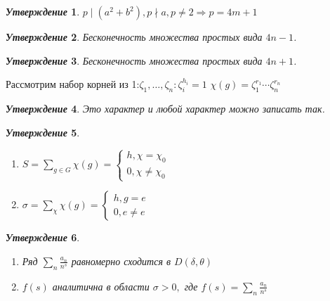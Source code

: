 \documentclass[a4paper,12pt]{article}
\newtheorem{utv2}{\textit{Утверждение}}
\newcommand{\TE}{\theta}
\newcommand{\q}{\quad}
\newcommand{\Ra}{\Rightarrow}
\newcommand{\SL}{\sum\limits}
\begin{document}
\begin{formbox}{}
\begin{utv2} $p\mid (a^2+b^2), p\nmid a, p\not=2 \Ra p = 4m+1$
\end{utv2}
\end{formbox}
\begin{formbox}{}
\begin{utv2} Бесконечность множества простых вида $4n-1$.
\end{utv2}
\end{formbox}
\begin{formbox}{}
\begin{utv2} Бесконечность множества простых вида $4n+1$.
\end{utv2}
\end{formbox}
\begin{formbox}{}
Рассмотрим набор корней из 1:$\zeta_1,\dots,\zeta_n: \zeta_i^{h_i} = 1$\q
$\chi(g) = \zeta_1^{r_1}\cdots \zeta_n^{r_n}$
\begin{utv2} Это характер и любой характер можно записать так.
\end{utv2}
\end{formbox}
\begin{formbox}{}
\begin{utv2}
\begin{enumerate}
\item $S = \SL_{g\in G}\chi(g) = \begin{cases}h, \chi = \chi_0\\ 0, \chi \not= \chi_0\end{cases}$
\item $\sigma = \SL_{\chi}\chi(g) = \begin{cases}h, g = e\\ 0, e \not= e\end{cases}$
\end{enumerate}
\end{utv2}
\end{formbox}
\begin{formbox}{}
\begin{utv2}\q\\
\begin{enumerate}
\item Ряд $\SL_n \frac{a_n}{n^s} $ равномерно сходится в $D(\delta, \TE)$
\item $f(s)$ аналитична в области $\sigma > 0,$ где $f(s) = \SL_n\frac{a_n}{n^s}$
\end{enumerate}
\end{utv2}
\end{formbox}
\end{document}
